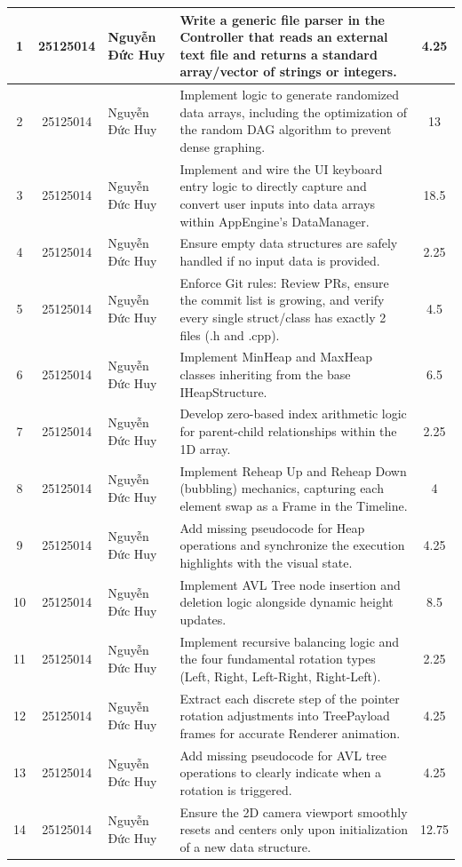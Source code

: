 \begin{center}
\begin{longtable}{|c|c|p{3.2cm}|p{6.5cm}|c|}
1 & 25125014 & Nguyễn Đức Huy & Write a generic file parser in the Controller that reads an external text file and returns a standard array/vector of strings or integers. & 4.25 \\ \hline
2 & 25125014 & Nguyễn Đức Huy & Implement logic to generate randomized data arrays, including the optimization of the random DAG algorithm to prevent dense graphing. & 13 \\ \hline
3 & 25125014 & Nguyễn Đức Huy & Implement and wire the UI keyboard entry logic to directly capture and convert user inputs into data arrays within AppEngine's DataManager. & 18.5 \\ \hline
4 & 25125014 & Nguyễn Đức Huy & Ensure empty data structures are safely handled if no input data is provided. & 2.25 \\ \hline
5 & 25125014 & Nguyễn Đức Huy & Enforce Git rules: Review PRs, ensure the commit list is growing, and verify every single struct/class has exactly 2 files (.h and .cpp). & 4.5 \\ \hline
6 & 25125014 & Nguyễn Đức Huy & Implement MinHeap and MaxHeap classes inheriting from the base IHeapStructure. & 6.5 \\ \hline
7 & 25125014 & Nguyễn Đức Huy & Develop zero-based index arithmetic logic for parent-child relationships within the 1D array. & 2.25 \\ \hline
8 & 25125014 & Nguyễn Đức Huy & Implement Reheap Up and Reheap Down (bubbling) mechanics, capturing each element swap as a Frame in the Timeline. & 4 \\ \hline
9 & 25125014 & Nguyễn Đức Huy & Add missing pseudocode for Heap operations and synchronize the execution highlights with the visual state. & 4.25 \\ \hline
10 & 25125014 & Nguyễn Đức Huy & Implement AVL Tree node insertion and deletion logic alongside dynamic height updates. & 8.5 \\ \hline
11 & 25125014 & Nguyễn Đức Huy & Implement recursive balancing logic and the four fundamental rotation types (Left, Right, Left-Right, Right-Left). & 2.25 \\ \hline
12 & 25125014 & Nguyễn Đức Huy & Extract each discrete step of the pointer rotation adjustments into TreePayload frames for accurate Renderer animation. & 4.25 \\ \hline
13 & 25125014 & Nguyễn Đức Huy & Add missing pseudocode for AVL tree operations to clearly indicate when a rotation is triggered. & 4.25 \\ \hline
14 & 25125014 & Nguyễn Đức Huy & Ensure the 2D camera viewport smoothly resets and centers only upon initialization of a new data structure. & 12.75 \\ \hline

\end{longtable}
\end{center}

